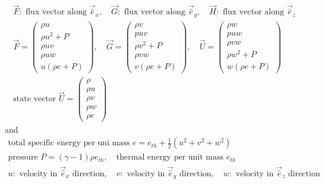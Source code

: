 \begin{equation}
    \begin{gathered}
        \vec{F}: \text{ flux vector along } \vec{\hat{e}}_x, \quad \vec{G}: \text{ flux vector along } \vec{\hat{e}}_y, \quad \vec{H}: \text{ flux vector along } \vec{\hat{e}}_z \\
        \vec{F}=\left(\begin{array}{c}
            \rho u \\
            \rho u^2+P \\
            \rho u v \\
            \rho u w \\
            u(\rho e+P)
            \end{array}\right), \quad \vec{G}=\left(\begin{array}{c}
            \rho v \\
            p u v \\
            \rho v^2+P \\
            \rho v w \\
            v(\rho e+P)
            \end{array}\right), \quad \vec{U}=\left(\begin{array}{c}
            \rho w \\
            p u w \\
            \rho v w \\
            \rho w^2+P \\
            w(\rho e+P)
            \end{array}\right) \\
        \text{state vector } \vec{U} = \left(\begin{array}{c}
            \rho \\
            \rho u \\
            \rho v \\
            \rho w \\
            \rho e
            \end{array}\right)
    \end{gathered}
\end{equation}
and
\begin{equation}
    \begin{gathered}
        \text{total specific energy per uni mass } e = e_{th} + \frac{1}{2} \left( u^2 + v^2 + w^2 \right) \\
        \text{pressure } P = (\gamma - 1) \rho e_{th}, \quad \text{thermal energy per unit mass } e_{th} \\
        u: \text{ velocity in } \vec{\hat{e}}_x \text{ direction}, \quad v: \text{ velocity in } \vec{\hat{e}}_y \text{ direction}, \quad w: \text{ velocity in } \vec{\hat{e}}_z \text{ direction}
    \end{gathered}
\end{equation}

